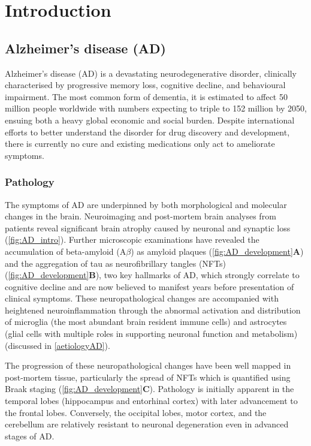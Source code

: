 \cleardoublepage
\chapter{Introduction}

\section{Alzheimer's disease (AD)}

Alzheimer’s disease (AD) is a devastating neurodegenerative disorder, clinically characterised by progressive memory loss, cognitive decline, and behavioural impairment. The most common form of dementia, it is estimated to affect 50 million people worldwide with numbers expecting to triple to 152 million by 2050, ensuing both a heavy global economic and social burden\cite{International2020}. Despite international efforts to better understand the disorder for drug discovery and development, there is currently no cure and existing medications only act to ameliorate symptoms.

\subsection{Pathology}
\label{ch1: ad_pathology}
The symptoms of AD are underpinned by both morphological and molecular changes in the brain. Neuroimaging and post-mortem brain analyses from patients reveal significant brain atrophy caused by neuronal and synaptic loss\cite{Selkoe1991,Perl2010} (\cref{fig:AD_intro}). Further microscopic examinations have revealed the accumulation of beta-amyloid (A$\beta$) as amyloid plaques (\cref{fig:AD_development}\textbf{A}) and the aggregation of tau as neurofibrillary tangles (NFTs) (\cref{fig:AD_development}\textbf{B}), two key hallmarks of AD, which strongly correlate to cognitive decline and are now believed to manifest years before presentation of clinical symptoms\cite{Sperling2011}. These neuropathological changes are accompanied with heightened neuroinflammation through the abnormal activation and distribution of microglia (the most abundant brain resident immune cells) and astrocytes (glial cells with multiple roles in supporting neuronal function and metabolism) \cite{Heneka2015} (discussed in \cref{aetiologyAD}). 

The progression of these neuropathological changes have been well mapped in post-mortem tissue, particularly the spread of NFTs which is quantified using Braak staging\cite{H1991} (\cref{fig:AD_development}\textbf{C}). Pathology is initially apparent in the temporal lobes (hippocampus and entorhinal cortex) with later advancement to the frontal lobes. Conversely, the occipital lobes, motor cortex, and the cerebellum are relatively resistant to neuronal degeneration even in advanced stages of AD\cite{Xu2019}. 

